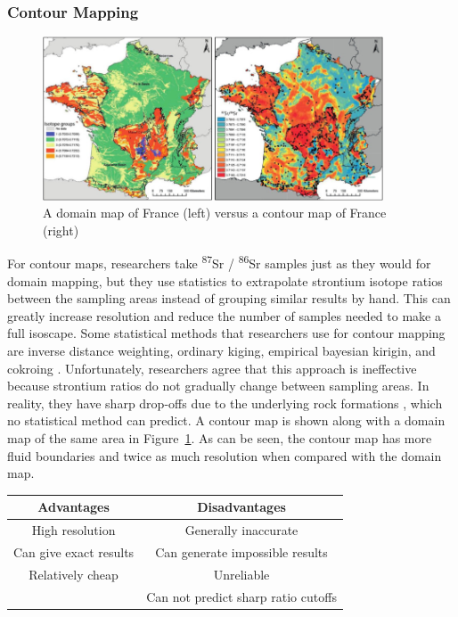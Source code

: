 \documentclass[a4paper, 12pt]{article}
\begin{document}
\subsubsection{Contour Mapping}
\begin{figure}[htbp]
    \centering
    \includegraphics[width=0.9\textwidth]{contour_mapping.jpg}
    \caption{A domain map of France (left) versus a contour map of France (right) \citep{willmes2018}}
    \label{fig:contour_mapping}
\end{figure}

For contour maps, researchers take \textsuperscript{87}Sr / \textsuperscript{86}Sr
samples just as they would for domain mapping, but they use statistics to extrapolate
strontium isotope ratios between the sampling areas instead of grouping similar results
by hand. This can greatly increase resolution and reduce the number of samples needed to make a full isoscape. Some statistical
methods that researchers use for contour mapping are inverse distance weighting, ordinary kiging, empirical bayesian kirigin,
and cokroing \citep{holt2021}. Unfortunately, researchers agree that this approach is ineffective
because strontium ratios do not gradually change between sampling areas. In reality,
they have sharp drop-offs due to the underlying rock formations \citep{holt2021}, which
no statistical method can predict. A contour map is shown along with a domain map of the same
area in Figure~\ref{fig:contour_mapping}. As can be seen, the contour map has more
fluid boundaries and twice as much resolution when compared with the domain map.

\begin{center}
    \begin{tabular}{||c | c||}
        \hline
        Advantages             & Disadvantages                       \\ [0.5ex]
        \hline\hline
        High resolution        & Generally inaccurate                \\
        \hline
        Can give exact results & Can generate impossible results     \\
        \hline
        Relatively cheap       & Unreliable                          \\
        \hline
                               & Can not predict sharp ratio cutoffs \\[1ex]
        \hline
    \end{tabular}
\end{center}
\end{document}
